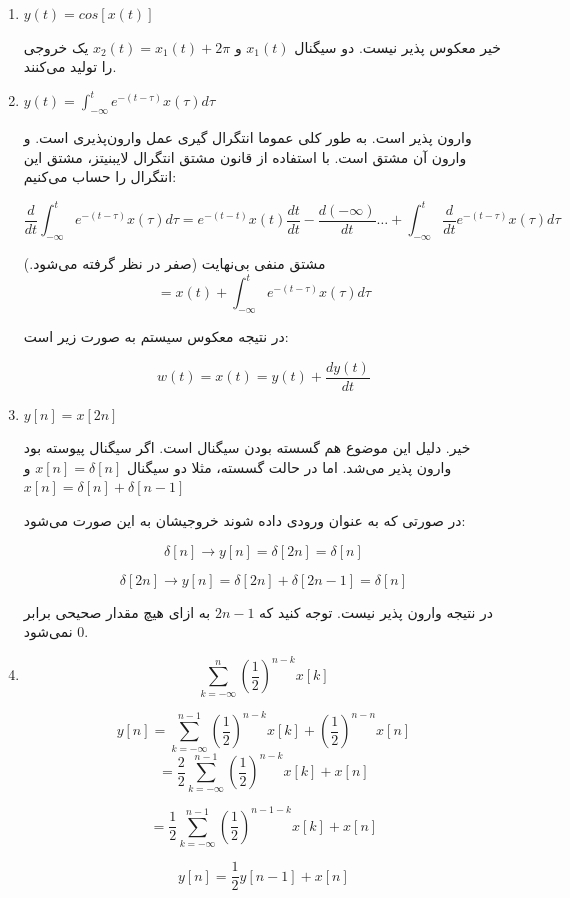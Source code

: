 \documentclass[12pt]{article}
\begin{document}
\begin{enumerate}[label = \harfi*)]
	
	\item
	$y(t) = cos[x(t)]$
	
	خیر معکوس پذیر نیست. دو سیگنال $x_1(t)$ و
	 $x_2(t) =x_1(t) + 2\pi$
	یک خروجی را تولید می‌کنند.
	
	\item
	$
	y(t)=\int_{-\infty}^{t} e^{-(t-\tau)} x(\tau) d \tau
	$
	
	وارون پذیر است. به طور کلی عموما انتگرال گیری عمل وارون‌پذیری است. و وارون آن مشتق است. با استفاده از قانون مشتق انتگرال لایبنیتز، مشتق این انتگرال را حساب‌ می‌کنیم:
	
	$$\frac{d}{dt} \int_{-\infty}^{t} e^{-(t - \tau)} x(\tau) d\tau = e^{-(t - t)} x(t) \frac{d t}{dt} - \frac{d (-\infty)}{dt} \dots + \int_{-\infty}^{t} \frac{d}{dt} e^{-(t - \tau)} x(\tau) d\tau $$
	
	مشتق منفی بی‌نهایت (صفر در نظر گرفته می‌شود.)
	$$= x(t) + \int_{-\infty}^{t} e^{-(t-\tau)} x(\tau) d\tau$$
	
	در نتیجه معکوس سیستم به صورت زیر است:
	
	$$w(t)= x(t) = y(t) + \frac{d y(t)}{dt}$$
	
	
	\item
	$y[n] = x[2n]$
	
	خیر. دلیل این موضوع هم گسسته بودن سیگنال است. اگر سیگنال پیوسته بود وارون پذیر می‌شد. اما در حالت گسسته، مثلا دو سیگنال
$x[n] = \delta[n]$
و
$x[n] = \delta[n] + \delta[n-1]$

در صورتی که به عنوان ورودی داده شوند خروجیشان به این صورت می‌شود:

$$\delta[n] \rightarrow y[n] = \delta[2n] = \delta[n]$$

$$\delta[2n] \rightarrow y[n] = \delta[2n] + \delta[2n-1] = \delta[n]$$

در نتیجه وارون پذیر نیست. توجه کنید که $2n-1$ به ازای هیچ مقدار صحیحی برابر $0$ نمی‌شود.


\item
$$
\sum_{k=-\infty}^{n}\left(\frac{1}{2}\right)^{n-k} x[k]
$$

$$
y[n] =\sum_{k=-\infty}^{n-1}\left(\frac{1}{2}\right)^{n-k} x[k]+\left(\frac{1}{2}\right)^{n-n} x[n]
$$
$$
=\frac{2}{2} \sum_{k=-\infty}^{n-1}\left(\frac{1}{2}\right)^{n-k} x[k]+x[n]
$$

$$
=\frac{1}{2} \sum_{k=-\infty}^{n-1}\left(\frac{1}{2}\right)^{n-1-k} x[k]+x[n]
$$

$$y[n] = \frac{1}{2}y[n-1] + x[n]$$


\end{enumerate}
\end{document}
